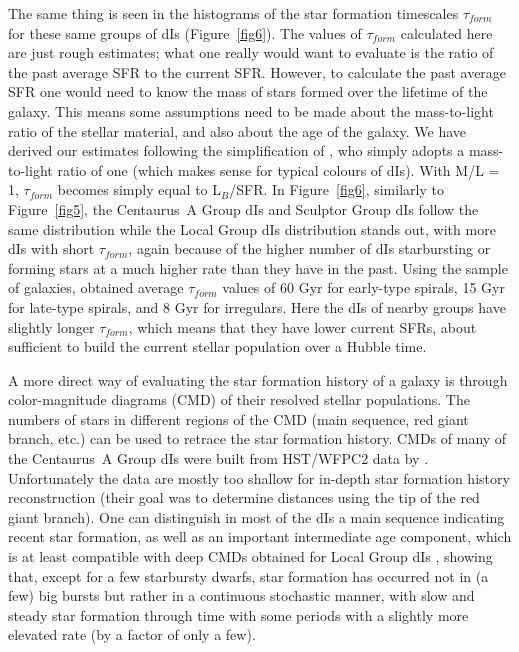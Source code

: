 \documentclass[preprint]{aastex}
\begin{document}
The same thing is seen in the histograms of the star formation timescales
$\tau _{form}$ for these same groups of dIs (Figure~\ref{fig6}). 
The values of $\tau _{form}$ calculated
here are just rough estimates; what one really would want to evaluate is
the ratio of the past average SFR to the current SFR. However, to calculate
the past average SFR one would need to know the mass of stars formed over
the lifetime of the galaxy. This means some assumptions need to be made
about the mass-to-light ratio of the stellar material, and also about
the age of the galaxy. We have derived our estimates following the
simplification of \citet{h93}, who simply adopts a mass-to-light ratio 
of one (which makes sense for typical colours of dIs). With M/L = 1,  
$\tau _{form}$ becomes simply equal to L$_B$/SFR. In Figure~\ref{fig6},
similarly to Figure~\ref{fig5}, the Centaurus~A Group dIs and Sculptor Group
dIs follow the same distribution while the Local Group dIs distribution
stands out, with more dIs with short $\tau _{form}$, again because of
the higher number of dIs starbursting or forming stars at a much higher
rate than they have in the past. Using the \citet{k83} sample of galaxies,
\citet{h93} obtained average $\tau _{form}$ values of 60 Gyr for early-type
spirals, 15 Gyr for late-type spirals, and 8 Gyr for irregulars. Here
the dIs of nearby groups have slightly longer $\tau _{form}$, which means
that they have lower current SFRs, about sufficient to 
build the current stellar population over a Hubble time.  

A more direct way of evaluating the star formation history of a galaxy
is through color-magnitude diagrams (CMD) of their resolved stellar populations.
The numbers of stars in different regions of the CMD (main sequence, 
red giant branch, etc.) can be used to retrace the star formation history.
CMDs of many of the Centaurus~A Group dIs were built from HST/WFPC2 data
by \citet{k02}.  Unfortunately the data are mostly too shallow
for in-depth star formation history reconstruction (their goal was to 
determine distances using
the tip of the red giant branch). One can distinguish in most
of the dIs a main sequence indicating recent star formation, as well
as an important intermediate age component, which is at least compatible
with deep CMDs obtained for Local Group dIs \citep[e.g.,][]{dp98},
showing that, except for a few starbursty dwarfs,  
star formation has occurred not in (a few) big bursts but rather
in a continuous stochastic manner, with slow and steady star formation
through time with some periods with a slightly more elevated rate (by a 
factor of only a few).
\end{document}
